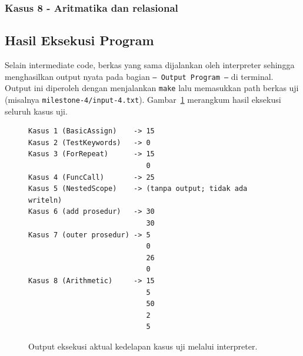 \documentclass[11pt,a4paper]{article}
\begin{document}




\subsubsection*{Kasus 8 - Aritmatika dan relasional}





\subsection{Hasil Eksekusi Program}

Selain intermediate code, berkas yang sama dijalankan oleh interpreter sehingga
menghasilkan output nyata pada bagian \texttt{--- Output Program ---} di
terminal. Output ini diperoleh dengan menjalankan \texttt{make} lalu memasukkan
path berkas uji (misalnya \texttt{milestone-4/input-4.txt}). Gambar~\ref{lst:exec}
merangkum hasil eksekusi seluruh kasus uji.

\begin{figure}[H]
\centering
\begin{Verbatim}[frame=single, fontsize=\small, rulecolor=\color{codeframe}]
Kasus 1 (BasicAssign)    -> 15
Kasus 2 (TestKeywords)   -> 0
Kasus 3 (ForRepeat)      -> 15
                            0
Kasus 4 (FuncCall)       -> 25
Kasus 5 (NestedScope)    -> (tanpa output; tidak ada writeln)
Kasus 6 (add prosedur)   -> 30
                            30
Kasus 7 (outer prosedur) -> 5
                            0
                            26
                            0
Kasus 8 (Arithmetic)     -> 15
                            5
                            50
                            2
                            5
\end{Verbatim}
\caption{Output eksekusi aktual kedelapan kasus uji melalui interpreter.}
\label{lst:exec}
\end{figure}
\end{document}
